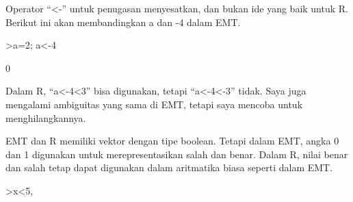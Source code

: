 \documentclass[a4paper,10pt]{article}
\begin{document}
\begin{eulernotebook}
\begin{eulercomment}
\begin{eulercomment}
\begin{eulercomment}
\begin{eulercomment}
\begin{eulercomment}
\begin{eulercomment}
\begin{eulercomment}
\begin{eulercomment}
\begin{eulercomment}
\begin{eulercomment}
\begin{eulercomment}
\begin{eulercomment}
\begin{eulercomment}
\begin{eulercomment}
\begin{eulercomment}
\begin{eulercomment}
\begin{eulercomment}
\begin{eulercomment}
\begin{eulercomment}
\begin{eulercomment}
\begin{eulercomment}
\begin{eulercomment}
\begin{eulercomment}
\begin{eulercomment}
\begin{eulercomment}
\begin{eulercomment}
\begin{eulercomment}
\begin{eulercomment}
\begin{eulercomment}
\begin{eulercomment}
\begin{eulercomment}
\begin{eulercomment}
\begin{eulercomment}
\begin{eulercomment}
\begin{eulercomment}
\begin{eulercomment}
\begin{eulercomment}
\begin{eulercomment}
\begin{eulercomment}
\begin{eulercomment}
\begin{eulercomment}
\begin{eulercomment}
\begin{eulercomment}
\begin{eulercomment}
\begin{eulercomment}
\begin{eulercomment}
\begin{eulercomment}
\begin{eulercomment}
\begin{euleroutput}
\end{euleroutput}
\begin{eulercomment}
Operator “\textless{}-” untuk penugasan menyesatkan, dan bukan ide yang baik
untuk R. Berikut ini akan membandingkan a dan -4 dalam EMT.
\end{eulercomment}
\begin{eulerprompt}
>a=2; a<-4
\end{eulerprompt}
\begin{euleroutput}
  0
\end{euleroutput}
\begin{eulercomment}
Dalam R, “a\textless{}-4\textless{}3” bisa digunakan, tetapi “a\textless{}-4\textless{}-3” tidak. Saya juga
mengalami ambiguitas yang sama di EMT, tetapi saya mencoba untuk
menghilangkannya.

EMT dan R memiliki vektor dengan tipe boolean. Tetapi dalam EMT, angka
0 dan 1 digunakan untuk merepresentasikan salah dan benar. Dalam R,
nilai benar dan salah tetap dapat digunakan dalam aritmatika biasa
seperti dalam EMT.
\end{eulercomment}
\begin{eulerprompt}
>x<5, %
\end{eulerprompt}
\begin{euleroutput}
  [0,  0,  1,  0,  0]
  [0,  0,  3.1,  0,  0]

\end{euleroutput}
\end{eulercomment}
\end{eulercomment}
\end{eulercomment}
\end{eulercomment}
\end{eulercomment}
\end{eulercomment}
\end{eulercomment}
\end{eulercomment}
\end{eulercomment}
\end{eulercomment}
\end{eulercomment}
\end{eulercomment}
\end{eulercomment}
\end{eulercomment}
\end{eulercomment}
\end{eulercomment}
\end{eulercomment}
\end{eulercomment}
\end{eulercomment}
\end{eulercomment}
\end{eulercomment}
\end{eulercomment}
\end{eulercomment}
\end{eulercomment}
\end{eulercomment}
\end{eulercomment}
\end{eulercomment}
\end{eulercomment}
\end{eulercomment}
\end{eulercomment}
\end{eulercomment}
\end{eulercomment}
\end{eulercomment}
\end{eulercomment}
\end{eulercomment}
\end{eulercomment}
\end{eulercomment}
\end{eulercomment}
\end{eulercomment}
\end{eulercomment}
\end{eulercomment}
\end{eulercomment}
\end{eulercomment}
\end{eulercomment}
\end{eulercomment}
\end{eulercomment}
\end{eulercomment}
\end{eulercomment}
\end{eulernotebook}
\end{document}
